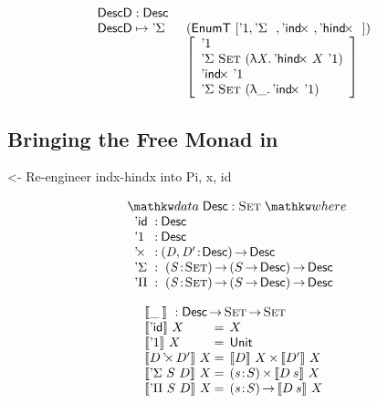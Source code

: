 \documentclass[preprint, authoryear, onecolumn]{sigplanconf}
\newenvironment{structure}{\footnotesize\verbatim}{\endverbatim}
\begin{document}
\[\stk{
\DescD : \Desc \\
\begin{array}{@{}ll}
\DescD \mapsto \DSigma{}{} & (\EnumT [ \DUnit, \DSigma{}{}, \DIndx{}, \DHindx{}{} ]) \\
                           & \left[\begin{array}{l}
                                   \DUnit                                \\
                                   \DSigma{\Set}{(\LAM{\V{X}} \DHindx{X}{\DUnit})} \\
                                   \DIndx{\DUnit}                                  \\
                                   \DSigma{\Set}{(\LAM{\_} \DIndx{\DUnit})}
                                   \end{array}
                             \right]
\end{array}
}
\]

\subsection{Bringing the Free Monad in}

\begin{structure}
<- Re-engineer indx-hindx into Pi, x, id
\end{structure}

\[
\stk{
\data \Desc : \Set \where \\
\;\;\begin{array}{@{}l@{\::\:}l@{\quad}l}
    \DId            & \Desc                                   \\
    \DUnit          & \Desc                                   \\
    \DProd{}{}      & \PI{\V{D}, \V{D'}}{\Desc} \Desc         \\
    \DSigma         & \PI{\V{S}}{\Set} \PIS{S \To \Desc} \Desc \\
    \DPi            & \PI{\V{S}}{\Set} \PIS{S \To \Desc} \Desc 
\end{array}
}
\]

\[\stk{
\descop{\_\:}{} : \Desc \To \Set \To \Set \\
\begin{array}{@{}l@{\:=\:\:}ll}
\descop{\DId}{X}          &  X                                           \\
\descop{\DUnit}{X}        &  \Unit                                       \\
\descop{\DProd{D}{D'}}{X} &  \TIMES{\descop{D}{X}}{\descop{D'}{X}}       \\
\descop{\DSigma{S}{D}}{X} &  \SIGMA{\V{s}}{S} \descop{D\: s}{X}                \\
\descop{\DPi{S}{D}}{X}    &  \PI{\V{s}}{S} \descop{D\: s}{X}            
\end{array}
}\]
\end{document}

